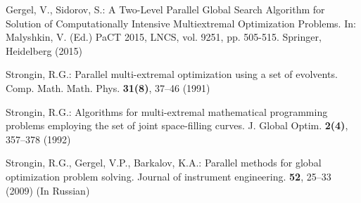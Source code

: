 \documentclass[runningheads]{llncs}
\begin{document}
\begin{thebibliography}{107}
Gergel, V., Sidorov, S.: A Two-Level Parallel Global Search Algorithm for Solution of Computationally Intensive Multiextremal Optimization Problems. In: Malyshkin, V. (Ed.) PaCT 2015, LNCS, vol. 9251, pp. 505-515. Springer, Heidelberg (2015)

Strongin, R.G.: Parallel multi-extremal optimization using a set of evolvents. Comp. Math. Math. Phys. \textbf{31(8)}, 37--46 (1991)

Strongin, R.G.: Algorithms for multi-extremal mathematical programming problems employing the set of joint space-filling curves. J. Global Optim. \textbf{2(4)}, 357--378 (1992)

Strongin, R.G., Gergel, V.P., Barkalov, K.A.: Parallel methods for global optimization problem solving. Journal of instrument engineering. \textbf{52}, 25--33 (2009) (In Russian)
\end{thebibliography}
\end{document}

